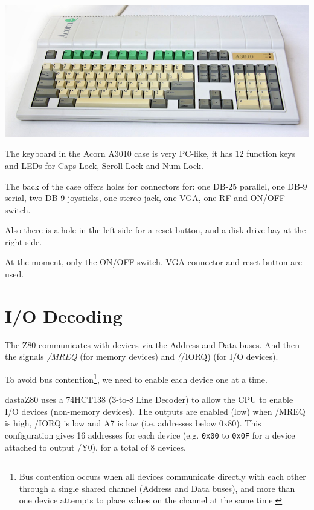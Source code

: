 \documentclass[a4paper,11pt]{article}
\begin{document}
    \begin{center}
        \includegraphics{acorn3010top.jpg}
    \end{center}

    The keyboard in the Acorn A3010 case is very PC-like, it has 12 function
    keys and LEDs for Caps Lock, Scroll Lock and Num Lock.

    The back of the case offers holes for connectors for: one DB-25 parallel, 
    one DB-9 serial, two DB-9 joysticks, one stereo jack, one VGA, one RF and
    ON/OFF switch.

    Also there is a hole in the left side for a reset button, and a disk drive
    bay at the right side.

    At the moment, only the ON/OFF switch, VGA connector and reset button are
    used.

    \pagebreak
    \section{I/O Decoding}

    The Z80 communicates with devices via the Address and Data buses. And then
    the signals \textit{/MREQ} (for memory devices) and \textit(/IORQ) (for I/O
    devices).

    To avoid bus contention\footnote{Bus contention occurs when all devices
    communicate directly with each other through a single shared channel
    (Address and Data buses), and more than one device attempts to place values
    on the channel at the same time.}, we need to enable each device one at a
    time.

    dastaZ80 uses a 74HCT138 (3-to-8 Line Decoder) to allow the CPU to enable
    I/O devices (non-memory devices). The outputs are enabled (low) when /MREQ
    is high, /IORQ is low and A7 is low (i.e. addresses below 0x80). This
    configuration gives 16 addresses for each device (e.g. \texttt{0x00} to
    \texttt{0x0F} for a device attached to output /Y0), for a total of 8 devices.
\end{document}
